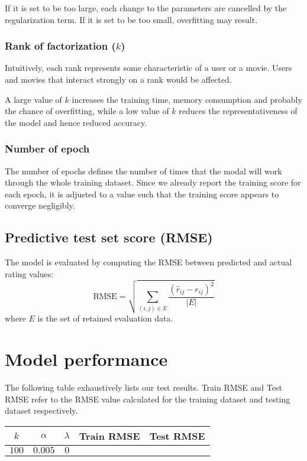 \documentclass[final]{cvpr}
\begin{document}
If it is set to be too large, each change to the parameters are cancelled by the regularization term. If it is set to be too small, overfitting may result.

\subsubsection{Rank of factorization ($k$)}
Intuitively, each rank represents some characteristic of a user or a movie. Users and movies that interact strongly on a rank would be affected.

A large value of $k$ increases the training time, memory consumption and probably the chance of overfitting,
while a low value of $k$ reduces the representativeness of the model and hence reduced accuracy.

\subsubsection{Number of epoch}
The number of epochs defines the number of times that the modal will work through the whole training dataset.
Since we already report the training score for each epoch, it is adjusted to a value such that the training score appears to converge negligibly.

\subsection{Predictive test set score (RMSE)}
The model is evaluated by computing the RMSE between predicted and actual rating values:
$$ \text{RMSE} = \sqrt{\sum_{(i, j) \in E} \frac{{(\hat r_{ij} - r_{ij})}^2}{\left| E \right|}} $$
where $E$ is the set of retained evaluation data.

\section{Model performance}
The following table exhaustively lists our test results. Train RMSE and Test RMSE refer to the RMSE value calculated for the training dataset and testing dataset respectively.

\begin{tabular}{| c | c | c | c | c |}
    \hline
		$k$ & $\alpha$ &  $\lambda$ & Train RMSE & Test RMSE \\
    \hline
		$100$ & $0.005$ & $0$ & & \\
    \hline
\end{tabular}\\
\end{document}
